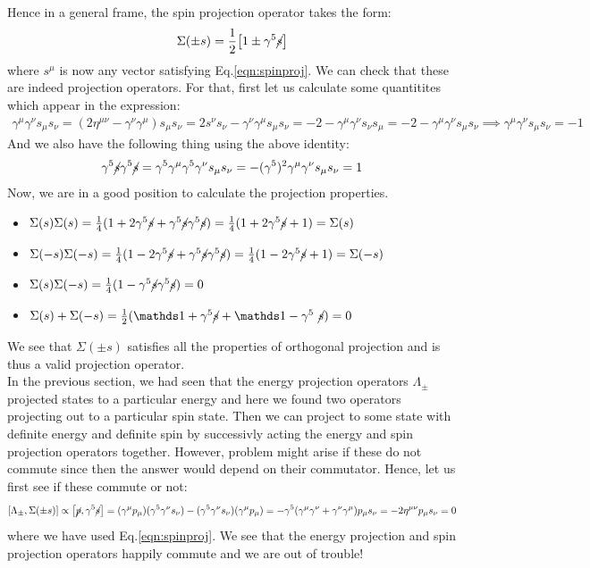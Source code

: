 Hence in a general frame, the spin projection operator takes the form:
$$\Sigma(\pm s) = \frac{1}{2}\qty[1 \pm \gamma^5 \cancel{s}]$$
where $s^\mu$ is now any vector satisfying Eq.\ref{eqn:spinproj}. We can check that these are indeed projection operators. For that, first let us calculate some quantitites which appear in the expression:
\begin{align*}
    \gamma^\mu \gamma^\nu s_\mu s_\nu = (2\eta^{\mu\nu} -\gamma^\nu \gamma^\mu) s_\mu s_\nu = 2 s^\nu s_\nu - \gamma^\nu \gamma^\mu s_\mu s_\nu =-2 - \gamma^\mu \gamma^\nu s_\nu s_\mu=-2 - \gamma^\mu \gamma^\nu  s_\mu s_\nu \implies \boxed{\gamma^\mu \gamma^\nu s_\mu s_\nu = -1}
\end{align*}
And we also have the following thing using the above identity:
\begin{align*}
    \gamma^5 \cancel{s}\gamma^5 \cancel{s} = \gamma^5 \gamma^\mu \gamma^5 \gamma^\nu s_\mu s_\nu = - (\gamma^5)^2 \gamma^\mu \gamma^\nu s_\mu s_\nu = 1
\end{align*}
Now, we are in a good position to calculate the projection properties. 
\begin{itemize}
    \item $\Sigma(s)\Sigma(s) = \frac{1}{4}(1 + 2\gamma^5\cancel{s}+\gamma^5\cancel{s}\gamma^5\cancel{s} )=\frac{1}{4}(1 + 2\gamma^5\cancel{s}+1) = \Sigma(s)$
    \item $\Sigma(-s)\Sigma(-s) = \frac{1}{4}(1 -2\gamma^5\cancel{s}+\gamma^5\cancel{s}\gamma^5\cancel{s} )=\frac{1}{4}(1 - 2\gamma^5\cancel{s}+1) = \Sigma(-s)$
    \item $\Sigma(s)\Sigma(-s) = \frac{1}{4}(1 -\gamma^5\cancel{s}\gamma^5\cancel{s} )= 0$
    \item $\Sigma(s)+\Sigma(-s) = \frac{1}{2}(\iden + \gamma^5 \gsl{s}  + \iden - \gamma^5\ \gsl{s}) = 0$
\end{itemize}
We see that $\Sigma(\pm s)$ satisfies all the properties of orthogonal projection and is thus a valid projection operator.\\[0.2cm]
In the previous section, we had seen that the energy projection operators $\Lambda_{\pm}$ projected states to a particular energy and here we found two operators projecting out to a particular spin state. Then we can project to some state with definite energy and definite spin by successivly acting the energy and spin projection operators together. However, problem might arise if these do not commute since then the answer would depend on their commutator. Hence, let us first see if these commute or not:
\begin{align*}
    \left[ \Lambda_{\pm}, \Sigma(\pm s) \right] \propto \left[  \cancel{p},  \gamma^5\cancel{s} \right] = (\gamma^\mu p_\mu) (\gamma^5 \gamma^\nu s_\nu) -(\gamma^5 \gamma^\nu s_\nu) (\gamma^\mu p_\mu) = -\gamma^5 (\gamma^\mu \gamma^\nu +\gamma^\nu\gamma^\mu )p_\mu s_\nu = -2\eta^{\mu\nu} p_\mu s_\nu = 0
\end{align*}
where we have used Eq.\ref{eqn:spinproj}. We see that the energy projection and spin projection operators happily commute and we are out of trouble!
